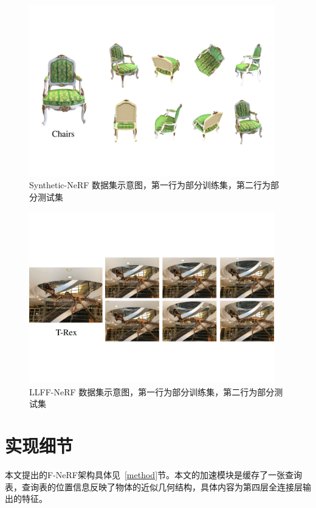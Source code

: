 \begin{figure}[thbp]
    \centering
    \includegraphics[width=0.95\textwidth]{figures/Chairs.pdf}
    \caption{Synthetic-NeRF 数据集示意图，第一行为部分训练集，第二行为部分测试集}
    \label{fig:Chairs}
\end{figure}

\begin{figure}[thbp]
    \centering
    \includegraphics[width=0.95\textwidth]{figures/T-Rex.pdf}
    \caption{LLFF-NeRF 数据集示意图，第一行为部分训练集，第二行为部分测试集}
    \label{fig:T-Rex}
\end{figure}
\newpage

\section{实现细节}\label{details}
本文提出的F-NeRF架构具体见~\ref{method}节。本文的加速模块是缓存了一张查询表，查询表的位置信息反映了物体的近似几何结构，具体内容为第四层全连接层输出的特征。

